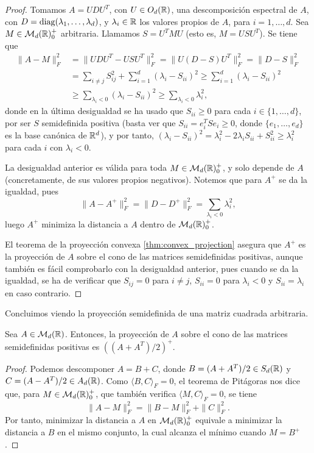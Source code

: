 \begin{proof}
    Tomamos $A = UDU^T$, con $U \in O_d(\mathbb{R})$, una descomposición espectral de $A$, con $D = \operatorname{diag}(\lambda_1,\dots,\lambda_d)$, y $\lambda_i \in \mathbb{R}$ los valores propios de $A$, para $i = 1,\dots,d$. Sea $M \in \mathcal{M}_d(\mathbb{R})^+_0$ arbitraria. Llamamos $S = U^TMU$ (esto es, $M = USU^T$). Se tiene que
    \begin{align*}
        \|A - M\|_F^2 &=\|UDU^T - USU^T\|_F^2 = \|U(D-S)U^T\|_F^2 = \|D-S\|_F^2 \\
                     &= \sum_{i \ne j} S_{ij}^2 + \sum_{i=1}^d (\lambda_i - S_{ii})^2 \ge \sum_{i=1}^d (\lambda_i - S_{ii})^2 \\
                     &\ge \sum_{\lambda_i < 0} (\lambda_ i - S_{ii})^2 \ge \sum_{\lambda_i < 0} \lambda_i^2,   
    \end{align*}
    donde en la última desigualdad se ha usado que $S_{ii} \ge 0$ para cada $i \in \{1,\dots,d\}$, por ser $S$ semidefinida positiva (basta ver que $S_{ii} = e_i^TSe_i \ge 0$, donde $\{e_1,\dots,e_d\}$ es la base canónica de $\mathbb{R}^d$), y por tanto, $(\lambda_i - S_{ii})^2 = \lambda_i^2 - 2\lambda_iS_{ii} + S_{ii}^2 \ge \lambda_i^2$ para cada $i$ con $\lambda_i < 0$.

    La desigualdad anterior es válida para toda $M \in \mathcal{M}_d(\mathbb{R})^+_0$, y solo depende de $A$ (concretamente, de sus valores propios negativos). Notemos que para $A^+$ se da la igualdad, pues
    \[\|A - A^+\|_F^2 = \|D - D^+\|_F^2 = \sum_{\lambda_i < 0} \lambda_i^2, \]
    luego $A^+$ minimiza la distancia a $A$ dentro de $\mathcal{M}_d(\mathbb{R})^+_0$.

    El teorema de la proyección convexa \ref{thm:convex_projection} asegura que $A^+$ es la proyección de $A$ sobre el cono de las matrices semidefinidas positivas, aunque también es fácil comprobarlo con la desigualdad anterior, pues cuando se da la igualdad, se ha de verificar que $S_{ij} = 0$ para $i \ne j$, $S_{ii} = 0$ para $\lambda_i < 0$ y $S_{ii} = \lambda_i$ en caso contrario.
\end{proof}

Concluimos viendo la proyección semidefinida de una matriz cuadrada arbitraria.

\begin{cor}
    Sea $A \in \mathcal{M}_d(\mathbb{R})$. Entonces, la proyección de $A$ sobre el cono de las matrices semidefinidas positivas es $((A + A^T)/2)^+$.
\end{cor}

\begin{proof}
    Podemos descomponer $A = B+C$, donde $B = (A+A^T)/2 \in S_d(\mathbb{R})$ y $C = (A - A^T)/2 \in A_d(\mathbb{R})$. Como $\langle B, C\rangle_F = 0$, el teorema de Pitágoras nos dice que, para $M \in \mathcal{M}_d(\mathbb{R})^+_0$, que también verifica $\langle M, C \rangle_F = 0$, se tiene
    \[ \|A - M\|_F^2 = \|B - M\|_F^2 + \|C\|_F^2. \]
    Por tanto, minimizar la distancia a $A$ en $\mathcal{M}_d(\mathbb{R})^+_0$ equivale a minimizar la distancia a $B$ en el mismo conjunto, la cual alcanza el mínimo cuando $M = B^+$.
\end{proof}


